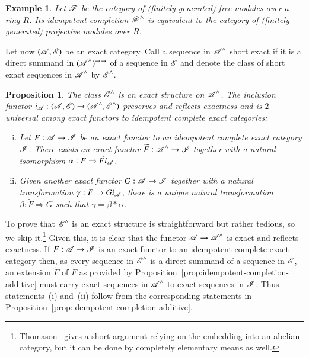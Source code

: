 \documentclass[1p]{elsarticle}
\makeatletter
\renewenvironment{proof}[1][\proofname]{\par
  \pushQED{\qed}%
  \normalfont \topsep6\p@\@plus6\p@\relax
  \trivlist
  \item[\hskip\labelsep
        \scshape
    #1\@addpunct{.}]\ignorespaces
}{%
  \popQED\endtrivlist\@endpefalse
}
\theoremstyle{mythm}
\newtheorem{Prop}[Thm]{Proposition}
\theoremstyle{mydef}
\newtheorem{Exm}[Thm]{Example}
\makeatother
\begin{document}
\begin{Exm}
  Let $\operatorname{\mathscr{F}}$ be the category of (finitely generated) 
  free modules over a ring $R$. Its
  idempotent completion $\operatorname{\mathscr{F}}^{\wedge}$ is equivalent to the category of
  (finitely generated) projective modules over $R$.
\end{Exm}

Let now $(\operatorname{\mathscr{A}}, \operatorname{\mathscr{E}})$ be an exact category. Call a sequence in
$\operatorname{\mathscr{A}}^{\wedge}$ short exact if it is a direct summand in
$(\operatorname{\mathscr{A}}^{\wedge})^{\to\to}$ of a sequence in $\operatorname{\mathscr{E}}$ and denote the class of
short exact sequences in $\operatorname{\mathscr{A}}^{\wedge}$ by $\operatorname{\mathscr{E}}^{\wedge}$.

\begin{Prop}
  \label{prop:idempotent-completion-exact}
  The class $\operatorname{\mathscr{E}}^{\wedge}$ is an exact structure on $\operatorname{\mathscr{A}}^{\wedge}$.
  The inclusion functor
  $i_{\operatorname{\mathscr{A}}}:(\operatorname{\mathscr{A}}, \operatorname{\mathscr{E}}) \to (\operatorname{\mathscr{A}}^{\wedge}, \operatorname{\mathscr{E}}^{\wedge})$ preserves
  and reflects exactness and is $2$-universal among exact functors
  to idempotent complete exact categories:
  \begin{enumerate}[(i)]
    \item
      Let $F: \operatorname{\mathscr{A}} \to \operatorname{\mathscr{I}}$ be an exact functor to an idempotent
      complete exact category $\operatorname{\mathscr{I}}$. There exists an exact functor
      $\widetilde{F}:\operatorname{\mathscr{A}}^{\wedge} \to \operatorname{\mathscr{I}}$ together with a natural
      isomorphism
      $\alpha: F \Rightarrow \widetilde{F} i_{\operatorname{\mathscr{A}}}$.

    \item
      Given another exact functor $G: \operatorname{\mathscr{A}} \to \operatorname{\mathscr{I}}$ together with a
      natural transformation $\gamma: F \Rightarrow G i_{\operatorname{\mathscr{A}}}$,
      there is a unique natural transformation 
      $\beta: \widetilde{F} \Rightarrow G$ 
      such that $\gamma = \beta \ast \alpha$.
  \end{enumerate}
\end{Prop}
\begin{proof}
  To prove that $\operatorname{\mathscr{E}}^{\wedge}$ is an exact structure is
  straightforward but rather tedious, so we skip it.\footnote{%
    Thomason~\cite[A.9.1~(b)]{MR1106918} gives a short argument
    relying on the embedding into an abelian category, but it can be
    done by completely elementary means as well.} Given this, it is
  clear that the functor $\operatorname{\mathscr{A}} \to \operatorname{\mathscr{A}}^{\wedge}$ is exact and
  reflects exactness.
  If $F: \operatorname{\mathscr{A}} \to \operatorname{\mathscr{I}}$ is an exact functor to an idempotent
  complete exact category then, as every sequence in $\operatorname{\mathscr{E}}^{\wedge}$
  is a direct summand of a sequence in $\operatorname{\mathscr{E}}$, an extension
  $\widetilde{F}$ of $F$ as provided by
  Proposition~\ref{prop:idempotent-completion-additive} 
  must carry exact sequences in $\operatorname{\mathscr{A}}^{\wedge}$ to exact sequences in
  $\operatorname{\mathscr{I}}$. Thus statements~(i) and~(ii) follow from the corresponding
  statements in Proposition~\ref{prop:idempotent-completion-additive}.
\end{proof}
\end{document}
